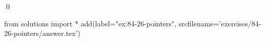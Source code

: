 
\begin{ex}
  \label{ex:84-26-pointers}
  
  \qed
\end{ex}
\begin{python0}
from solutions import *
add(label="ex:84-26-pointers",
    srcfilename='exercises/84-26-pointers/answer.tex')
\end{python0}
